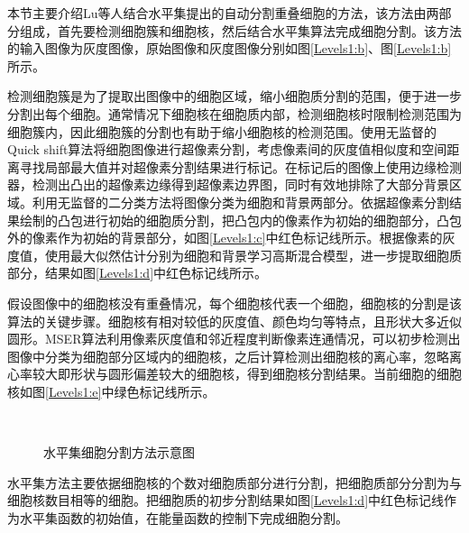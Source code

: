 \documentclass[nomlist,masters]{seuthesix}
\begin{document}
本节主要介绍Lu等人\cite{Lu2013Automated}结合水平集提出的自动分割重叠细胞的方法，该方法由两部分组成，首先要检测细胞簇和细胞核，然后结合水平集算法完成细胞分割。该方法的输入图像为灰度图像，原始图像和灰度图像分别如图\ref{Levels1:b}、图\ref{Levels1:b}所示。

检测细胞簇是为了提取出图像中的细胞区域，缩小细胞质分割的范围，便于进一步分割出每个细胞。通常情况下细胞核在细胞质内部，检测细胞核时限制检测范围为细胞簇内，因此细胞簇的分割也有助于缩小细胞核的检测范围。使用无监督的Quick shift算法\cite{Vedaldi2008Quick}将细胞图像进行超像素分割，考虑像素间的灰度值相似度和空间距离寻找局部最大值并对超像素分割结果进行标记。在标记后的图像上使用边缘检测器，检测出凸出的超像素边缘得到超像素边界图，同时有效地排除了大部分背景区域。利用无监督的二分类方法将图像分类为细胞和背景两部分。依据超像素分割结果绘制的凸包进行初始的细胞质分割，把凸包内的像素作为初始的细胞部分，凸包外的像素作为初始的背景部分，如图\ref{Levels1:c}中红色标记线所示。根据像素的灰度值，使用最大似然估计分别为细胞和背景学习高斯混合模型，进一步提取细胞质部分，结果如图\ref{Levels1:d}中红色标记线所示。

假设图像中的细胞核没有重叠情况，每个细胞核代表一个细胞，细胞核的分割是该算法的关键步骤。细胞核有相对较低的灰度值、颜色均匀等特点，且形状大多近似圆形。MSER算法\cite{Matas2004Robust}利用像素灰度值和邻近程度判断像素连通情况，可以初步检测出图像中分类为细胞部分区域内的细胞核，之后计算检测出细胞核的离心率，忽略离心率较大即形状与圆形偏差较大的细胞核，得到细胞核分割结果。当前细胞的细胞核如图\ref{Levels1:e}中绿色标记线所示。

\begin{figure}[H]
\centering 
\hspace{0.01\textwidth}
\hspace{0.01\textwidth}
\vfill
\centering 
\hspace{0.01\textwidth}
\caption{水平集细胞分割方法示意图}
\label{Levels1}
\end{figure}

水平集方法主要依据细胞核的个数对细胞质部分进行分割，把细胞质部分分割为与细胞核数目相等的细胞。把细胞质的初步分割结果如图\ref{Levels1:d}中红色标记线作为水平集函数的初始值，在能量函数的控制下完成细胞分割。
\end{document}
